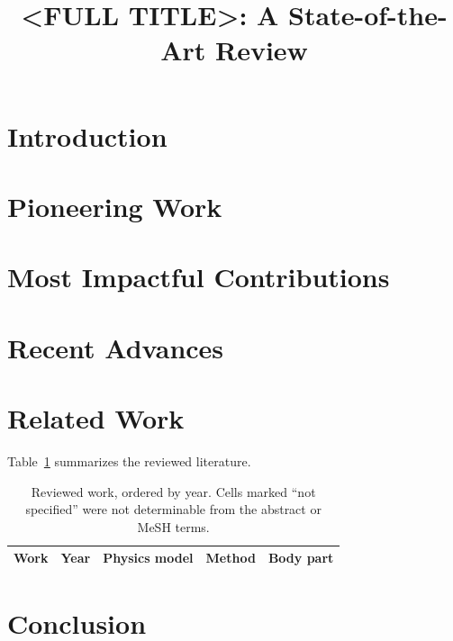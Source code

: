 \documentclass[sn-mathphys-num]{sn-jnl}
\begin{document}
\title[State of the Art: <SHORT TITLE>]{<FULL TITLE>: A State-of-the-Art Review}

\author[1]{ }\email{}

\abstract{%
}


\maketitle

\section{Introduction}\label{sec:intro}

\section{Pioneering Work}\label{sec:pioneers}

\section{Most Impactful Contributions}\label{sec:impact}

\section{Recent Advances}\label{sec:recent}

\section{Related Work}\label{sec:related}
Table~\ref{tab:related} summarizes the reviewed literature.

\begin{table}[t]
  \caption{Reviewed work, ordered by year. Cells marked ``not specified'' were not
  determinable from the abstract or MeSH terms.}\label{tab:related}
  \begin{tabular}{@{}lllll@{}}
    \toprule
    Work & Year & Physics model & Method & Body part \\
    \midrule
    \bottomrule
  \end{tabular}
\end{table}

\section{Conclusion}\label{sec:conclusion}


\end{document}
